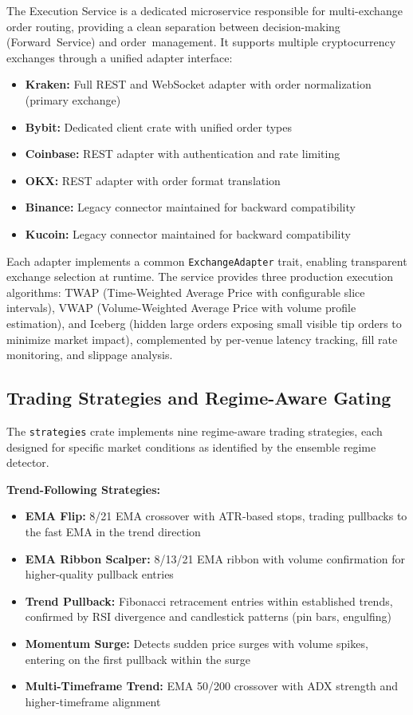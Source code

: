 \documentclass[12pt, a4paper]{article}
\begin{document}
The Execution Service is a dedicated microservice responsible for multi-exchange order routing, providing a clean separation between decision-making (Forward~Service) and order~management. It supports multiple cryptocurrency exchanges through a unified adapter interface:

\begin{itemize}
	\item \textbf{Kraken:} Full REST and WebSocket adapter with order normalization (primary exchange)
	\item \textbf{Bybit:} Dedicated client crate with unified order types
	\item \textbf{Coinbase:} REST adapter with authentication and rate limiting
	\item \textbf{OKX:} REST adapter with order format translation
	\item \textbf{Binance:} Legacy connector maintained for backward compatibility
	\item \textbf{Kucoin:} Legacy connector maintained for backward compatibility
\end{itemize}

Each adapter implements a common \texttt{ExchangeAdapter} trait, enabling transparent exchange selection at runtime. The service provides three production execution algorithms: TWAP (Time-Weighted Average Price with configurable slice intervals), VWAP (Volume-Weighted Average Price with volume profile estimation), and Iceberg (hidden large orders exposing small visible tip orders to minimize market impact), complemented by per-venue latency tracking, fill rate monitoring, and slippage analysis.

\subsection{Trading Strategies and Regime-Aware Gating}
\label{sec:strategies}

The \texttt{strategies} crate implements nine regime-aware trading strategies, each designed for specific market conditions as identified by the ensemble regime detector.

\textbf{Trend-Following Strategies:}
\begin{itemize}
	\item \textbf{EMA Flip:} 8/21 EMA crossover with ATR-based stops, trading pullbacks to the fast EMA in the trend direction
	\item \textbf{EMA Ribbon Scalper:} 8/13/21 EMA ribbon with volume confirmation for higher-quality pullback entries
	\item \textbf{Trend Pullback:} Fibonacci retracement entries within established trends, confirmed by RSI divergence and candlestick patterns (pin bars, engulfing)
	\item \textbf{Momentum Surge:} Detects sudden price surges with volume spikes, entering on the first pullback within the surge
	\item \textbf{Multi-Timeframe Trend:} EMA 50/200 crossover with ADX strength and higher-timeframe alignment
\end{itemize}
\end{document}
